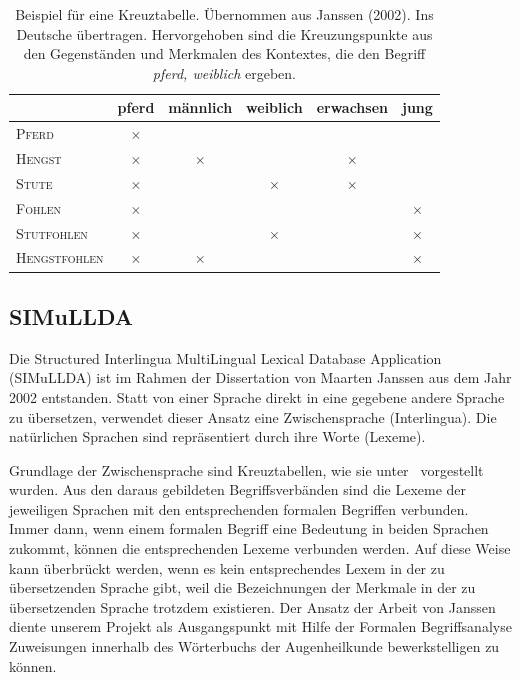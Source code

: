 \documentclass[pagesize,DIV=calc,12pt,final]{scrreprt}
\begin{document}
\begin{table}[h!]
\centering
\renewcommand{\arraystretch}{2}
\begin{tabular}{@{}lccccc@{}}
\toprule&
pferd &
männlich &
weiblich &
erwachsen &
jung\\
\midrule
\textsc{Pferd}	&	$\times$	&&&&\\

\textsc{Hengst}	&	$\times$	&	$\times$	&&	$\times$	&\\

\textsc{Stute}	&	$\times$	&&	$\times$	&	$\times$	&\\

\textsc{Fohlen}	&	$\times$	&&&&	$\times$\\

\textsc{Stutfohlen}	&	$\times$	&&	$\times$	&&	$\times$\\

\textsc{Hengstfohlen}	&	$\times$	&	$\times$	&&&	$\times$\\
\bottomrule
\end{tabular}
\caption{Beispiel für eine Kreuztabelle. Übernommen aus Janssen (2002). Ins Deutsche übertragen. Hervorgehoben sind die Kreuzungspunkte aus den Gegenständen und Merkmalen des Kontextes, die den Begriff \textit{pferd, weiblich} ergeben.}
\label{tab:janssen}
\end{table}

\subsection{SIMuLLDA}

Die Structured Interlingua MultiLingual Lexical Database Application (SIMuLLDA) ist im Rahmen der Dissertation von Maarten Janssen aus dem Jahr 2002 entstanden. 
Statt von einer Sprache direkt in eine gegebene andere Sprache zu übersetzen, verwendet dieser Ansatz eine Zwischensprache (Interlingua). 
Die natürlichen Sprachen sind repräsentiert durch ihre Worte (Lexeme). 

Grundlage der Zwischensprache sind Kreuztabellen, wie sie unter\emph{~} vorgestellt wurden. 
Aus den daraus gebildeten Begriffsverbänden sind die Lexeme der jeweiligen Sprachen mit den entsprechenden formalen Begriffen verbunden. 
Immer dann, wenn einem formalen Begriff eine Bedeutung in beiden Sprachen zukommt, können die entsprechenden Lexeme verbunden werden. 
Auf diese Weise kann überbrückt werden, wenn es kein entsprechendes Lexem in der zu übersetzenden Sprache gibt, weil die Bezeichnungen der Merkmale in der zu übersetzenden Sprache trotzdem existieren. 
Der Ansatz der Arbeit von Janssen diente unserem Projekt als Ausgangspunkt mit Hilfe der Formalen Begriffsanalyse Zuweisungen innerhalb des Wörterbuchs der Augenheilkunde bewerkstelligen zu können. 
\end{document}
